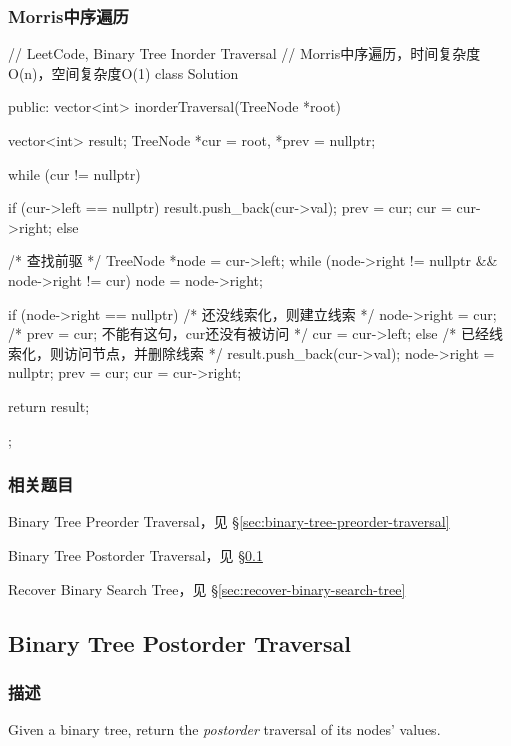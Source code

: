 \subsubsection{Morris中序遍历}
\begin{Code}
// LeetCode, Binary Tree Inorder Traversal
// Morris中序遍历，时间复杂度O(n)，空间复杂度O(1)
class Solution {
public:
    vector<int> inorderTraversal(TreeNode *root) {
        vector<int> result;
        TreeNode *cur = root, *prev = nullptr;

        while (cur != nullptr) {
            if (cur->left == nullptr) {
                result.push_back(cur->val);
                prev = cur;
                cur = cur->right;
            } else {
                /* 查找前驱 */
                TreeNode *node = cur->left;
                while (node->right != nullptr && node->right != cur)
                    node = node->right;

                if (node->right == nullptr) { /* 还没线索化，则建立线索 */
                    node->right = cur;
                    /* prev = cur; 不能有这句，cur还没有被访问 */
                    cur = cur->left;
                } else {    /* 已经线索化，则访问节点，并删除线索  */
                    result.push_back(cur->val);
                    node->right = nullptr;
                    prev = cur;
                    cur = cur->right;
                }
            }
        }
        return result;
    }
};
\end{Code}


\subsubsection{相关题目}
\begindot
\item Binary Tree Preorder Traversal，见 \S \ref{sec:binary-tree-preorder-traversal}
\item Binary Tree Postorder Traversal，见 \S \ref{sec:binary-tree-postorder-traversal}
\item Recover Binary Search Tree，见 \S \ref{sec:recover-binary-search-tree}
\myenddot


\subsection{Binary Tree Postorder Traversal}
\label{sec:binary-tree-postorder-traversal}


\subsubsection{描述}
Given a binary tree, return the \emph{postorder} traversal of its nodes' values.

